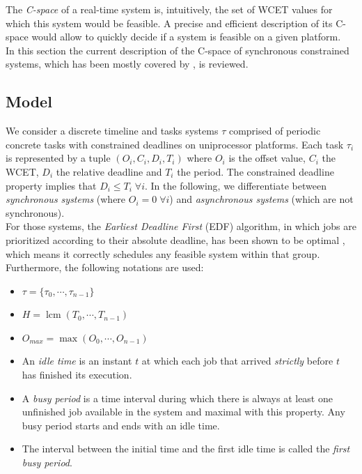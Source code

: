 \documentclass[conference]{IEEEtran}
\begin{document}
  The \emph{C-space} of a real-time system is, intuitively,
  the set of WCET values for which this system would be feasible. A
  precise and efficient description of its C-space would allow to quickly decide
  if a system is feasible on a given platform.\\

  In this section the current description of the C-space of synchronous
  constrained systems, which has been mostly covered by \cite{george2009characterization}, is reviewed.

  \subsection{Model}

    We consider a discrete timeline and tasks systems $\tau$ comprised of periodic concrete
    tasks with constrained deadlines on uniprocessor platforms. Each task
    $\tau_i$ is represented by a tuple $(O_i, C_i, D_i, T_i)$ where $O_i$ is the offset value,
    $C_i$ the WCET, $D_i$ the relative deadline and $T_i$ the period.
    The constrained deadline property implies that $D_i \leq T_i \; \forall i$. In
    the following, we differentiate between \emph{synchronous systems} (where $O_i
    = 0 \; \forall i$) and \emph{asynchronous systems} (which are not synchronous).\\

    For those systems, the \emph{Earliest Deadline First} (EDF) algorithm, in
    which jobs are prioritized according to their absolute deadline, has been
    shown to be optimal \cite{liu1973scheduling}, which means it
    correctly schedules any feasible system within that group.\\

    Furthermore, the following notations are used:
    \begin{itemize}
      \item $\tau = \{\tau_0, \cdots, \tau_{n-1}\}$
      \item $H = \operatorname{lcm}(T_0, \cdots, T_{n-1})$
      \item $O_{max} = \max (O_0, \cdots, O_{n-1})$
      \item An \emph{idle time} is an instant $t$ at which each job that arrived
      \emph{strictly} before $t$ has finished its execution.
      \item A \emph{busy period} is a time interval during which there is always
      at least one unfinished job available in the system and maximal
      with this property. Any busy period starts and ends
      with an idle time.
      \item The interval between the initial time and the first
      idle time is called the \emph{first busy period}.
    \end{itemize}
\end{document}
